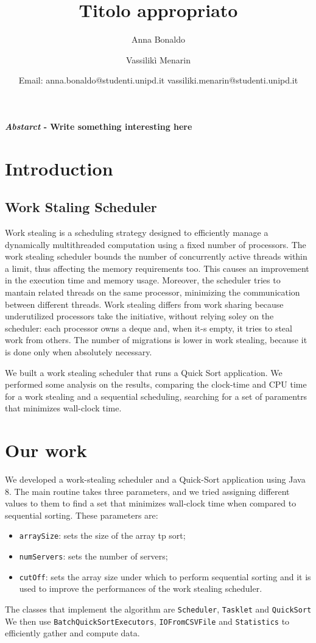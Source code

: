 \documentclass[twocolumn]{article}
\title{\LARGE \textbf{Titolo appropriato}}
\author{Anna Bonaldo \and Vassilikì Menarin }
\date{\small {Email: anna.bonaldo@studenti.unipd.it vassiliki.menarin@studenti.unipd.it }}
\def\code#1{\texttt{#1}}
\begin{document}
	

	\maketitle
	
	\textbf{\textit{Abstarct} - Write something interesting here}

	
	\section{Introduction}
	\subsection{Work Staling Scheduler}
	Work stealing is a scheduling strategy designed to efficiently manage a dynamically multithreaded computation using a fixed number of processors. The work stealing scheduler bounds the number of concurrently active threads within a limit, thus affecting the memory requirements too. This causes an improvement in the execution time and memory usage. Moreover, the scheduler tries to mantain related threads on the same processor, minimizing the communication between different threads.
	Work stealing differs from work sharing because underutilized processors take the initiative, without relying soley on the scheduler: each processor owns a deque and, when it-s empty, it tries to steal work from others. The number of migrations is lower in work stealing, because it is done only when absolutely necessary.
	
	We built a work stealing scheduler that runs a Quick Sort application. We performed some analysis on the results, comparing the clock-time and CPU time for a work stealing and a sequential scheduling, searching for a set of paramentrs that minimizes wall-clock time.
	
	\section{Our work}
	We developed a work-stealing scheduler and a Quick-Sort application using Java 8. The main routine takes three parameters, and we tried assigning different values to them to find a set that minimizes wall-clock time when compared to sequential sorting. These parameters are:
	\begin{itemize}
		\item \code{arraySize}: sets the size of the array tp sort;
		\item \code{numServers}: sets the number of servers;
		\item \code{cutOff}: sets the array size under which to perform sequential sorting and it is used to improve the performances of the work stealing scheduler.
	\end{itemize}
	The classes that implement the algorithm are \code{Scheduler}, \code{Tasklet} and \code{QuickSort} We then use \code{BatchQuickSortExecutors}, \code{IOFromCSVFile} and \code{Statistics} to efficiently gather and compute data.
	
\end{document}
